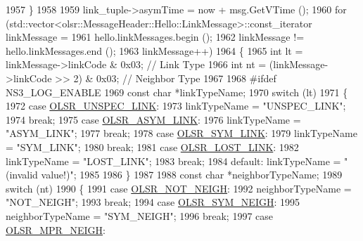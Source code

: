 \begin{DoxyCode}
1957     \}
1958 
1959   link\_tuple->asymTime = now + msg.GetVTime ();
1960   \textcolor{keywordflow}{for} (std::vector<olsr::MessageHeader::Hello::LinkMessage>::const\_iterator linkMessage =
1961          hello.linkMessages.begin ();
1962        linkMessage != hello.linkMessages.end ();
1963        linkMessage++)
1964     \{
1965       \textcolor{keywordtype}{int} lt = linkMessage->linkCode & 0x03; \textcolor{comment}{// Link Type}
1966       \textcolor{keywordtype}{int} nt = (linkMessage->linkCode >> 2) & 0x03; \textcolor{comment}{// Neighbor Type}
1967 
1968 \textcolor{preprocessor}{#ifdef NS3\_LOG\_ENABLE}
1969       \textcolor{keyword}{const} \textcolor{keywordtype}{char} *linkTypeName;
1970       \textcolor{keywordflow}{switch} (lt)
1971         \{
1972         \textcolor{keywordflow}{case} \hyperlink{olsr-routing-protocol_8cc_a5c8faefa61edbdfbca0858c3cc09e463}{OLSR\_UNSPEC\_LINK}:
1973           linkTypeName = \textcolor{stringliteral}{"UNSPEC\_LINK"};
1974           \textcolor{keywordflow}{break};
1975         \textcolor{keywordflow}{case} \hyperlink{olsr-routing-protocol_8cc_a8ebf1daea9834b2e4dfb42ca05b05f4a}{OLSR\_ASYM\_LINK}:
1976           linkTypeName = \textcolor{stringliteral}{"ASYM\_LINK"};
1977           \textcolor{keywordflow}{break};
1978         \textcolor{keywordflow}{case} \hyperlink{olsr-routing-protocol_8cc_aa7acefeda0e22f22d9ca6b9f445859d7}{OLSR\_SYM\_LINK}:
1979           linkTypeName = \textcolor{stringliteral}{"SYM\_LINK"};
1980           \textcolor{keywordflow}{break};
1981         \textcolor{keywordflow}{case} \hyperlink{olsr-routing-protocol_8cc_ab230470cf0b3270a8bba72a05501dd8d}{OLSR\_LOST\_LINK}:
1982           linkTypeName = \textcolor{stringliteral}{"LOST\_LINK"};
1983           \textcolor{keywordflow}{break};
1984         \textcolor{keywordflow}{default}: linkTypeName = \textcolor{stringliteral}{"(invalid value!)"};
1985           
1986         \}
1987 
1988       \textcolor{keyword}{const} \textcolor{keywordtype}{char} *neighborTypeName;
1989       \textcolor{keywordflow}{switch} (nt)
1990         \{
1991         \textcolor{keywordflow}{case} \hyperlink{olsr-routing-protocol_8cc_a7ff690f7463019aec83c1f0edd911034}{OLSR\_NOT\_NEIGH}:
1992           neighborTypeName = \textcolor{stringliteral}{"NOT\_NEIGH"};
1993           \textcolor{keywordflow}{break};
1994         \textcolor{keywordflow}{case} \hyperlink{olsr-routing-protocol_8cc_a46286c316da9922151b354295e71d35a}{OLSR\_SYM\_NEIGH}:
1995           neighborTypeName = \textcolor{stringliteral}{"SYM\_NEIGH"};
1996           \textcolor{keywordflow}{break};
1997         \textcolor{keywordflow}{case} \hyperlink{olsr-routing-protocol_8cc_a08fbe0b4c74b944f681630df4fa0fd82}{OLSR\_MPR\_NEIGH}:

\end{DoxyCode}
